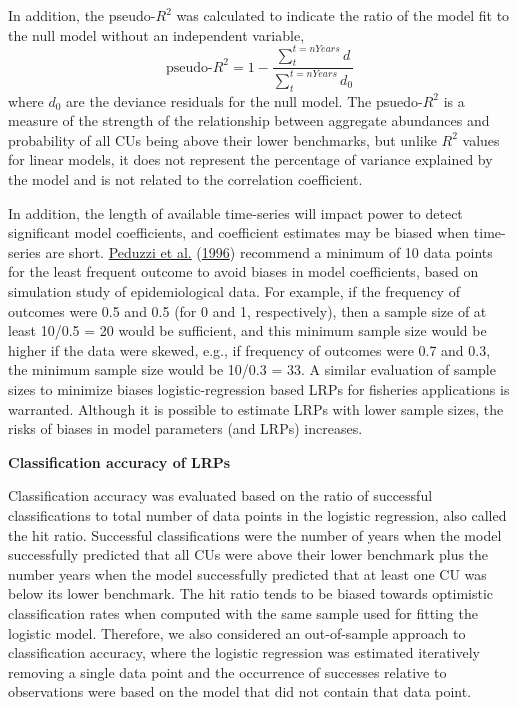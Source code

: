 \documentclass[11pt]{book}
\begin{document}
In addition, the pseudo-\(R^2\) was calculated to indicate the ratio of the model fit to the null model without an independent variable,
\begin{equation}
   \text{pseudo-}R^2 =  1- \frac{\sum_{t}^{t=nYears} d}{\sum_{t}^{t=nYears} d_0} 
   \label{eq:psuedoR2}
\end{equation}
where \(d_0\) are the deviance residuals for the null model. The psuedo-\(R^2\) is a measure of the strength of the relationship between aggregate abundances and probability of all CUs being above their lower benchmarks, but unlike \(R^2\) values for linear models, it does not represent the percentage of variance explained by the model and is not related to the correlation coefficient.

In addition, the length of available time-series will impact power to detect significant model coefficients, and coefficient estimates may be biased when time-series are short. \protect\hyperlink{ref-peduzziSimulationStudyNumber1996}{Peduzzi et al.} (\protect\hyperlink{ref-peduzziSimulationStudyNumber1996}{1996}) recommend a minimum of 10 data points for the least frequent outcome to avoid biases in model coefficients, based on simulation study of epidemiological data. For example, if the frequency of outcomes were 0.5 and 0.5 (for 0 and 1, respectively), then a sample size of at least 10/0.5 = 20 would be sufficient, and this minimum sample size would be higher if the data were skewed, e.g., if frequency of outcomes were 0.7 and 0.3, the minimum sample size would be 10/0.3 = 33. A similar evaluation of sample sizes to minimize biases logistic-regression based LRPs for fisheries applications is warranted. Although it is possible to estimate LRPs with lower sample sizes, the risks of biases in model parameters (and LRPs) increases.

\textbf{Classification accuracy of LRPs}

Classification accuracy was evaluated based on the ratio of successful classifications to total number of data points in the logistic regression, also called the hit ratio. Successful classifications were the number of years when the model successfully predicted that all CUs were above their lower benchmark plus the number years when the model successfully predicted that at least one CU was below its lower benchmark. The hit ratio tends to be biased towards optimistic classification rates when computed with the same sample used for fitting the logistic model. Therefore, we also considered an out-of-sample approach to classification accuracy, where the logistic regression was estimated iteratively removing a single data point and the occurrence of successes relative to observations were based on the model that did not contain that data point.
\end{document}
